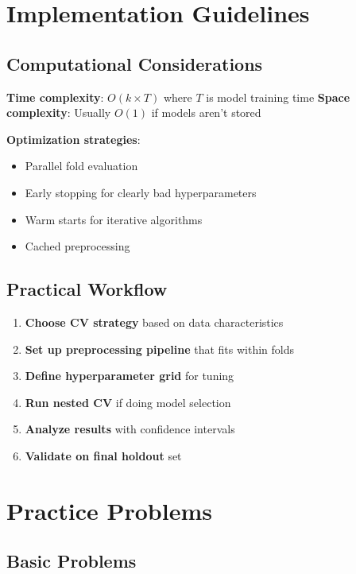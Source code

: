 \documentclass{article}
\begin{document}
\section{Implementation Guidelines}

\subsection{Computational Considerations}

\textbf{Time complexity}: $O(k \times T)$ where $T$ is model training time
\textbf{Space complexity}: Usually $O(1)$ if models aren't stored

\textbf{Optimization strategies}:
\begin{itemize}
    \item Parallel fold evaluation
    \item Early stopping for clearly bad hyperparameters
    \item Warm starts for iterative algorithms
    \item Cached preprocessing
\end{itemize}

\subsection{Practical Workflow}

\begin{enumerate}
    \item \textbf{Choose CV strategy} based on data characteristics
    \item \textbf{Set up preprocessing pipeline} that fits within folds
    \item \textbf{Define hyperparameter grid} for tuning
    \item \textbf{Run nested CV} if doing model selection
    \item \textbf{Analyze results} with confidence intervals
    \item \textbf{Validate on final holdout} set
\end{enumerate}

\section{Practice Problems}

\subsection{Basic Problems}
\end{document}
